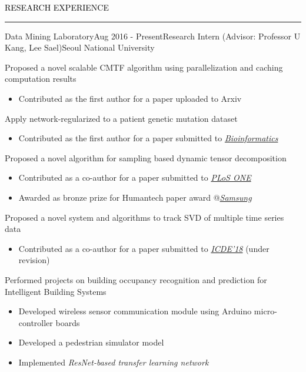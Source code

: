 \documentclass{resume} %
\renewenvironment{rSection}[1]{
	\sectionskip
	\textcolor{Black}{\MakeUppercase{#1}}
	\sectionlineskip
	\hrule
	\begin{list}{}{
			\setlength{\leftmargin}{1.5em}
		}
		\item[]
	}{
	\end{list}
}
\begin{document}
\vspace*{-2.0mm}
\begin{rSection}{Research Experience}
\begin{rSubsection}{Data Mining Laboratory}{Aug 2016 - Present}{Research Intern (Advisor: Professor U Kang, Lee Sael)}{Seoul National University}
	\item Proposed a novel scalable CMTF algorithm using parallelization and caching computation results
	\begin{itemize}
		\vspace*{-2.5mm}
		\item Contributed as the first author for a paper uploaded to Arxiv
	\end{itemize}
	\item Apply network-regularized to a patient genetic mutation dataset
	\begin{itemize}
		\vspace*{-2.0mm}
		\item Contributed as the first author for a paper submitted to \href{https://academic.oup.com/bioinformatics}{\textit{Bioinformatics}}
	\end{itemize}
	\item Proposed a novel algorithm for sampling based dynamic tensor decomposition
	\begin{itemize}
		\vspace*{-2.0mm}
		\item Contributed as a co-author for a paper submitted to \href{http://journals.plos.org/plosone/}{\textit{PLoS ONE}}
		\vspace*{-2.0mm}
		\item Awarded as bronze prize for Humantech paper award @\em{\href{https://humantech.samsung.com/saitext/index.jsp}{Samsung}}\em
	\end{itemize}
	\item Proposed a novel system and algorithms to track SVD of multiple time series data
	\begin{itemize}
		\vspace*{-2.0mm}
		\item Contributed as a co-author for a paper submitted to \href{https://icde2018.org/}{\textit{ICDE'18}} (under revision)
	\end{itemize}
	\item Performed projects on building occupancy recognition and prediction for Intelligent Building Systems
	\begin{itemize}
		\vspace*{-2.0mm}
		\item Developed wireless sensor communication module using Arduino micro-controller boards
		\vspace*{-2.0mm}
		\item Developed a pedestrian simulator model
		\vspace*{-2.0mm}
		\item Implemented \em{ResNet}\em-based transfer learning network
	\end{itemize}
\end{rSubsection}
\vspace*{-2.0mm}


\end{rSection}
\end{document}
